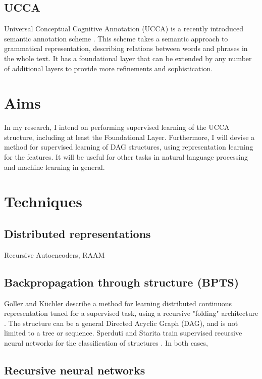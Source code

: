 \documentclass[11pt]{article} \usepackage{cite}
\begin{document}
\subsection{UCCA}

Universal Conceptual Cognitive Annotation (UCCA) is a recently introduced
semantic annotation scheme \cite{abend2013universal}. This scheme takes a
semantic approach to grammatical representation, describing relations between
words and phrases in the whole text. It has a foundational layer that can be
extended by any number of additional layers to provide more refinements and
sophistication.


\section{Aims}

In my research, I intend on performing supervised learning of the UCCA
structure, including at least the Foundational Layer. Furthermore, I will devise
a method for supervised learning of DAG structures, using representation
learning for the features. It will be useful for other tasks in natural language
processing and machine learning in general.

\section{Techniques}

\subsection{Distributed representations}

Recursive Autoencoders, RAAM

\subsection{Backpropagation through structure (BPTS)}

Goller and K{\"u}chler describe a method for learning distributed continuous
representation tuned for a supervised task, using a recursive "folding"
architecture \cite{goller1996learning}. The structure can be a general Directed
Acyclic Graph (DAG), and is not limited to a tree or sequence. Sperduti and
Starita train supervised recursive neural networks for the classification of
structures \cite{sperduti1997supervised}. In both cases, 

\subsection{Recursive neural networks}
\end{document}
